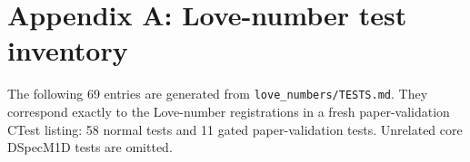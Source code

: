\documentclass[11pt,a4paper]{article}
\newcommand{\code}[1]{\texttt{#1}}
\begin{document}
\clearpage
\appendix
\section*{Appendix A: Love-number test inventory}
\label{app:tests}

The following 69 entries are generated from \code{love\_numbers/TESTS.md}.
They correspond exactly to the Love-number registrations in a fresh
paper-validation CTest listing: 58 normal tests and 11 gated
paper-validation tests.  Unrelated core DSpecM1D tests are omitted.

\setlength{\emergencystretch}{2em}
\sloppy




\end{document}
